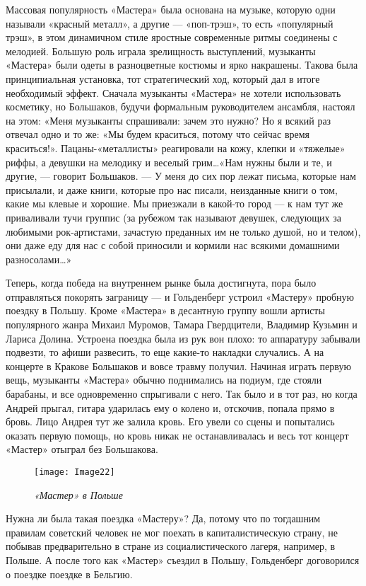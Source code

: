 \documentclass[16pt,a5paper,oneside]{book}
\begin{document}
Массовая популярность «Мастера» была основана на музыке, которую одни называли «красный металл», а другие — «поп-трэш»,
то есть «популярный трэш», в этом динамичном стиле яростные современные ритмы соединены с мелодией. Большую роль играла
зрелищность выступлений, музыканты «Мастера» были одеты в разноцветные костюмы и ярко накрашены. Такова была
принципиальная установка, тот стратегический ход, который дал в итоге необходимый эффект. Сначала музыканты «Мастера» не
хотели использовать косметику, но Большаков, будучи формальным руководителем ансамбля, настоял на этом: «Меня музыканты
спрашивали: зачем это нужно? Но я всякий раз отвечал одно и то же: «Мы будем краситься, потому что сейчас время
краситься!». Пацаны-«металлисты» реагировали на кожу, клепки и «тяжелые» риффы, а девушки на мелодику и веселый
грим\ldots «Нам нужны были и те, и другие, — говорит Большаков. — У меня до сих пор лежат письма, которые нам присылали,
и даже книги, которые про нас писали, неизданные книги о том, какие мы клевые и хорошие. Мы приезжали в какой-то город —
к нам тут же приваливали тучи группис (за рубежом так называют девушек, следующих за любимыми рок-артистами, зачастую
преданных им не только душой, но и телом), они даже еду для нас с собой приносили и кормили нас всякими домашними
разносолами\ldots»

Теперь, когда победа на внутреннем рынке была достигнута, пора было отправляться покорять заграницу — и Гольденберг
устроил «Мастеру» пробную поездку в Польшу. Кроме «Мастера» в десантную группу вошли артисты популярного жанра Михаил
Муромов, Тамара Гвердцители, Владимир Кузьмин и Лариса Долина. Устроена поездка была из рук вон плохо: то аппаратуру
забывали подвезти, то афиши развесить, то еще какие-то накладки случались. А на концерте в Кракове Большаков и вовсе
травму получил. Начиная играть первую вещь, музыканты «Мастера» обычно поднимались на подиум, где стояли барабаны, и все
одновременно спрыгивали с него. Так было и в тот раз, но когда Андрей прыгал, гитара ударилась ему о колено и, отскочив,
попала прямо в бровь. Лицо Андрея тут же залила кровь. Его увели со сцены и попытались оказать первую помощь, но кровь
никак не останавливалась и весь тот концерт «Мастер» отыграл без Большакова.

\begin{figure}
    \centering
    \texttt{[image: Image22]}
    \caption{\textit{«Мастер» в Польше}}
\end{figure}

Нужна ли была такая поездка «Мастеру»? Да, потому что по тогдашним правилам советский человек не мог поехать в
капиталистическую страну, не побывав предварительно в стране из социалистического лагеря, например, в Польше. А после
того как «Мастер» съездил в Польшу, Гольденберг договорился о поездке поездке в Бельгию.
\end{document}
